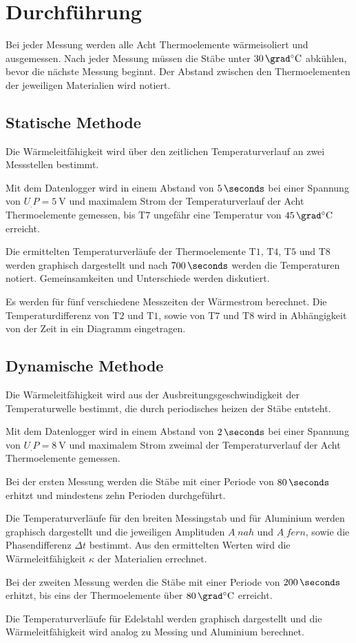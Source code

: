 
\section{Durchführung}
\label{sec:Durchführung}

Bei jeder Messung werden alle Acht Thermoelemente wärmeisoliert und ausgemessen.
Nach jeder Messung müssen die Stäbe unter $\SI{30}{\grad\celsius}$ abkühlen, bevor die nächste Messung beginnt. Der Abstand zwischen den Thermoelementen der jeweiligen Materialien wird notiert. 

\subsection{Statische Methode}

Die Wärmeleitfähigkeit wird über den zeitlichen Temperaturverlauf an zwei Messstellen bestimmt.

Mit dem Datenlogger wird in einem Abstand von $\SI{5}{\seconds}$ bei einer Spannung von $U_.P = \SI{5}{\volt}$ und maximalem Strom der Temperaturverlauf der Acht Thermoelemente gemessen, bis $\text{T}7$ ungefähr eine Temperatur von $\SI{45}{\grad\celsius}$ erreicht.

Die ermittelten Temperaturverläufe der Thermoelemente $\text{T}1$, $\text{T}4$, $\text{T}5$ und $\text{T}8$ werden graphisch dargestellt und nach $\SI{700}{\seconds}$ werden die Temperaturen notiert. Gemeinsamkeiten und Unterschiede werden diskutiert. 

Es werden für fünf verschiedene Messzeiten der Wärmestrom berechnet. 
Die Temperaturdifferenz von $\text{T}2$ und $\text{T}1$, sowie von $\text{T}7$ und $\text{T}8$ wird in Abhängigkeit von der Zeit in ein Diagramm eingetragen.
 
\subsection{Dynamische Methode}

Die Wärmeleitfähigkeit wird aus der Ausbreitungsgeschwindigkeit der Temperaturwelle bestimmt, die durch periodisches heizen der Stäbe entsteht.

Mit dem Datenlogger wird in einem Abstand von $\SI{2}{\seconds}$ bei einer Spannung von $U_.P = \SI{8}{\volt}$ und maximalem Strom zweimal der Temperaturverlauf der Acht Thermoelemente gemessen.

Bei der ersten Messung werden die Stäbe mit einer Periode von $\SI{80}{\seconds}$ erhitzt und mindestens zehn Perioden durchgeführt.

Die Temperaturverläufe für den breiten Messingstab und für Aluminium werden graphisch dargestellt und die jeweiligen Amplituden $A_.{nah}$ und $A_.{fern}$, sowie die Phasendifferenz $\Delta t$ bestimmt. Aus den ermittelten Werten wird die Wärmeleitfähigkeit $\kappa$ der Materialien errechnet. 

Bei der zweiten Messung werden die Stäbe mit einer Periode von $\SI{200}{\seconds}$ erhitzt, bis eins der Thermoelemente über $\SI{80}{\grad\celsius}$ erreicht.

Die Temperaturverläufe für Edelstahl werden graphisch dargestellt und die Wärmeleitfähigkeit wird analog zu Messing und Aluminium berechnet.